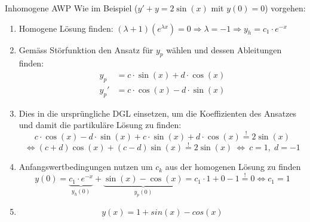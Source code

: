 \begin{Rezept}{Inhomogene AWP}{}
    Wie im Beispiel ($y' + y = 2\sin(x)$ mit $y(0)=0$) vorgehen:
	\begin{enumerate}
	    \item { Homogene Lösung finden: $(\lambda+1)(e^{\lambda x}) = 0 \Rightarrow \lambda = -1 \Rightarrow y_h = c_1 \cdot e^{-x}$ }
	    \item { Gemäss Störfunktion den Ansatz für $y_p$ wählen und dessen
            Ableitungen finden:
            \begin{align*}
              y_p & = c\cdot \sin(x) + d\cdot \cos(x)\\
              y_p' & = c\cdot \cos(x) - d\cdot \sin(x) 
            \end{align*}
	        }
	    \item { Dies in die ursprüngliche DGL einsetzen, um die Koeffizienten des Ansatzes und damit die partikuläre Lösung zu finden:
	       \[ c \cdot \cos(x) - d\cdot \sin(x) + c\cdot \sin(x) + d\cdot \cos(x) \stackrel{!}{=} 2\sin(x)\] \[ \Leftrightarrow (c+d) \cos(x) + (c-d) \sin(x) \stackrel{!}{=} 2\sin(x) ~ \Longleftrightarrow ~ c=1,\;d=-1 \]
	    }
	    \item{
	        Anfangswertbedingungen nutzen um $c_k$ aus der homogenen Lösung zu finden
	        \[ y(0) = \underbrace{c_1 \cdot e^{-x}}_{y_h(0)} + \underbrace{\sin(x)-\cos(x)}_{y_p(0)} = c_1\cdot1 + 0 - 1 \stackrel{!}{=} 0 \Leftrightarrow c_1 = 1 \]
	    }
	    \item{
	        \[ y(x) = 1 + sin(x) - cos(x) \] 
	   }
	\end{enumerate}
\end{Rezept}






